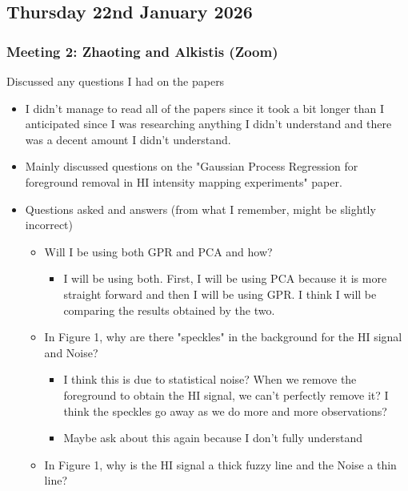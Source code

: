 \subsection{Thursday 22nd January 2026}

\subsubsection{Meeting 2: Zhaoting and Alkistis (Zoom)}

    \item Discussed any questions I had on the papers
    \begin{itemize}
        \item I didn't manage to read all of the papers since it took a bit longer than I anticipated since I was researching anything I didn't understand and there was a decent amount I didn't understand. 
        \item Mainly discussed questions on the "Gaussian Process Regression for foreground removal in HI intensity mapping experiments" paper.
        \item Questions asked and answers (from what I remember, might be slightly incorrect)
        \begin{itemize}
            \item Will I be using both GPR and PCA and how? 
            \begin{itemize}
                \item I will be using both. First, I will be using PCA because it is more straight forward and then I will be using GPR. I think I will be comparing the results obtained by the two.
            \end{itemize}
        \item In Figure 1, why are there "speckles" in the background for the HI signal and Noise?
        \begin{itemize}
            \item I think this is due to statistical noise? When we remove the foreground to obtain the HI signal, we can't perfectly remove it? I think the speckles go away as we do more and more observations?
            \item \color{red} Maybe ask about this again because I don't fully understand \color{black}
        \end{itemize}
        \item In Figure 1, why is the HI signal a thick fuzzy line and the Noise a thin line?
        \begin{itemize}

\end{itemize}
\end{itemize}
\end{itemize}
